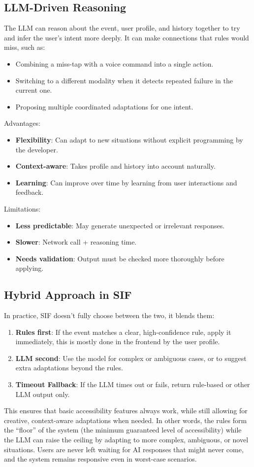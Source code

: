\subsection{LLM-Driven Reasoning}
The LLM can reason about the event, user profile, and history together to try and infer the user's intent more deeply. It can make connections that rules would miss, such as:
\begin{itemize}
    \item Combining a miss-tap with a voice command into a single action.
    \item Switching to a different modality when it detects repeated failure in the current one.
    \item Proposing multiple coordinated adaptations for one intent.
\end{itemize}
Advantages:
\begin{itemize}
    \item \textbf{Flexibility}: Can adapt to new situations without explicit programming by the developer.
    \item \textbf{Context-aware}: Takes profile and history into account naturally.
    \item \textbf{Learning}: Can improve over time by learning from user interactions and feedback.
\end{itemize}
Limitations:
\begin{itemize}
    \item \textbf{Less predictable}: May generate unexpected or irrelevant responses.
    \item \textbf{Slower}: Network call + reasoning time.
    \item \textbf{Needs validation}: Output must be checked more thoroughly before applying.
\end{itemize}

\subsection{Hybrid Approach in SIF}
In practice, SIF doesn’t fully choose between the two, it blends them:
\begin{enumerate}
    \item \textbf{Rules first}: If the event matches a clear, high-confidence rule, apply it immediately, this is mostly done in the frontend by the user profile.
    \item \textbf{LLM second}: Use the model for complex or ambiguous cases, or to suggest extra adaptations beyond the rules.
    \item \textbf{Timeout Fallback}: If the LLM times out or fails, return rule-based or other LLM output only.
\end{enumerate}
This ensures that basic accessibility features always work, while still allowing for creative, context-aware adaptations when needed. In other words, the rules form the “floor” of the system (the minimum guaranteed level of accessibility) while the LLM can raise the ceiling by adapting to more complex, ambiguous, or novel situations. Users are never left waiting for AI responses that might never come, and the system remains responsive even in worst-case scenarios.

